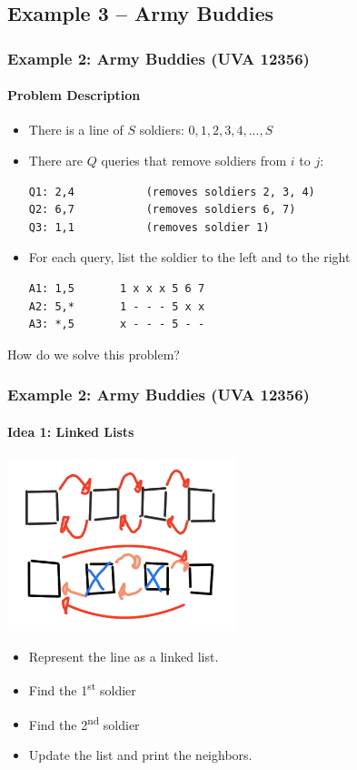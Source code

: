 \documentclass{beamer}
\begin{document}
\subsection{Example 3 -- Army Buddies}

\begin{frame}[fragile]
  \frametitle{Example 2: Army Buddies (UVA 12356)}
  \framesubtitle{Problem Description}

  \begin{block}{}
    \begin{itemize}
    \item There is a line of $S$ soldiers: $0,1,2,3,4,...,S$
    \item There are $Q$ queries that remove soldiers from $i$ to $j$:
\begin{verbatim}
Q1: 2,4           (removes soldiers 2, 3, 4)
Q2: 6,7           (removes soldiers 6, 7)
Q3: 1,1           (removes soldier 1)
\end{verbatim}
    \item For each query, list the soldier to the \alert{left} and to the \alert{right}
\begin{verbatim}
A1: 1,5       1 x x x 5 6 7
A2: 5,*       1 - - - 5 x x
A3: *,5       x - - - 5 - -
\end{verbatim}
    \end{itemize}
  \end{block}

  \bigskip

  How do we solve this problem?
\end{frame}

\begin{frame}
  \frametitle{Example 2: Army Buddies (UVA 12356)}
  \framesubtitle{Idea 1: Linked Lists}

  \begin{center}
    \includegraphics[width=0.5\textwidth]{img/army-list}
  \end{center}

  \begin{itemize}
  \item Represent the line as a linked list.
  \item Find the 1\textsuperscript{st} soldier \hfill {}
  \item Find the 2\textsuperscript{nd} soldier \hfill {}
  \item Update the list and print the neighbors. \hfill {}
  \end{itemize}
  \bigskip

\end{frame}
\end{document}
